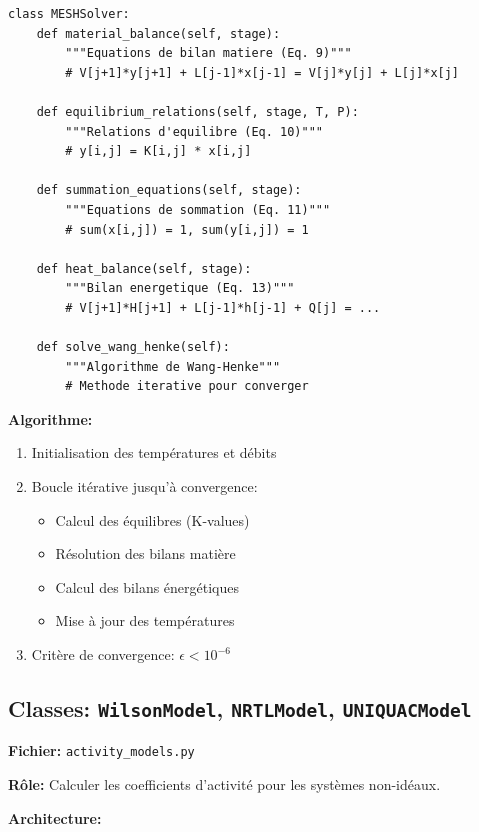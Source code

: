 \documentclass[11pt,a4paper]{article}
\begin{document}
\begin{lstlisting}
class MESHSolver:
    def material_balance(self, stage):
        """Equations de bilan matiere (Eq. 9)"""
        # V[j+1]*y[j+1] + L[j-1]*x[j-1] = V[j]*y[j] + L[j]*x[j]

    def equilibrium_relations(self, stage, T, P):
        """Relations d'equilibre (Eq. 10)"""
        # y[i,j] = K[i,j] * x[i,j]

    def summation_equations(self, stage):
        """Equations de sommation (Eq. 11)"""
        # sum(x[i,j]) = 1, sum(y[i,j]) = 1

    def heat_balance(self, stage):
        """Bilan energetique (Eq. 13)"""
        # V[j+1]*H[j+1] + L[j-1]*h[j-1] + Q[j] = ...

    def solve_wang_henke(self):
        """Algorithme de Wang-Henke"""
        # Methode iterative pour converger
\end{lstlisting}

\textbf{Algorithme:}
\begin{enumerate}
\item Initialisation des températures et débits
\item Boucle itérative jusqu'à convergence:
\begin{itemize}
\item Calcul des équilibres (K-values)
\item Résolution des bilans matière
\item Calcul des bilans énergétiques
\item Mise à jour des températures
\end{itemize}
\item Critère de convergence: $\epsilon < 10^{-6}$
\end{enumerate}

\subsection{Classes: \texttt{WilsonModel}, \texttt{NRTLModel}, \texttt{UNIQUACModel}}

\textbf{Fichier:} \texttt{activity\_models.py}

\textbf{Rôle:} Calculer les coefficients d'activité pour les systèmes non-idéaux.

\textbf{Architecture:}
\end{document}
